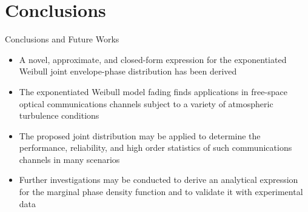 \documentclass[aspectratio=169]{beamer}
\begin{document}
\section{Conclusions}
\begin{frame}{Conclusions and Future Works}
    \begin{itemize}
        \item A novel, approximate, and closed-form expression for the exponentiated Weibull joint envelope-phase distribution has been derived
        \item The exponentiated Weibull model fading finds applications in free-space optical communications channels subject to a variety of atmospheric turbulence conditions
        \item The proposed joint distribution may be applied to determine the performance, reliability, and high order statistics of such communications channels in many scenarios
        \item Further investigations may be conducted to derive an analytical expression for the marginal phase density function and to validate it with experimental data
    \end{itemize}
\end{frame}
\end{document}
